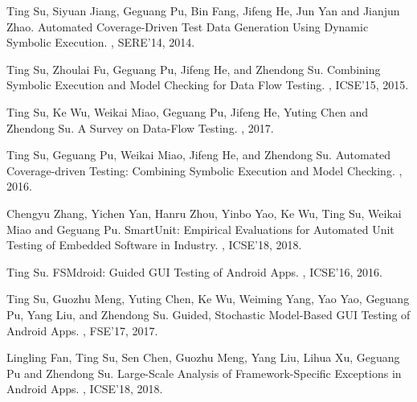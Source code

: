 \documentclass[a4paper]{article}
\begin{document}
\begin{thebibliography}{99}
	
	\newblock Ting Su, Siyuan Jiang, Geguang Pu, Bin Fang, Jifeng He, Jun Yan and Jianjun Zhao.
	\newblock Automated Coverage-Driven Test Data Generation Using Dynamic Symbolic Execution.
	, SERE'14, 2014.
	
	\newblock Ting Su, Zhoulai Fu, Geguang Pu, Jifeng He, and Zhendong Su.
	\newblock Combining Symbolic Execution and Model Checking for Data Flow Testing.
	, ICSE'15, 2015.
	
	\newblock Ting Su, Ke Wu, Weikai Miao, Geguang Pu, Jifeng He, Yuting Chen and Zhendong Su.
	\newblock A Survey on Data-Flow Testing.
	, 2017.
	
	\newblock Ting Su, Geguang Pu, Weikai Miao, Jifeng He, and Zhendong Su.
	\newblock Automated Coverage-driven Testing: Combining Symbolic Execution and Model Checking. 
	, 2016.

	\newblock Chengyu Zhang, Yichen Yan, Hanru Zhou, Yinbo Yao, Ke Wu, Ting Su, Weikai Miao and Geguang Pu.
	\newblock SmartUnit: Empirical Evaluations for Automated Unit Testing of Embedded Software in Industry.
	, ICSE'18, 2018.
	
	\newblock Ting Su.
	\newblock FSMdroid: Guided GUI Testing of Android Apps.
	, ICSE'16, 2016.
	
	\newblock Ting Su, Guozhu Meng, Yuting Chen, Ke Wu, Weiming Yang, Yao Yao, Geguang Pu, Yang Liu, and Zhendong Su.
	\newblock Guided, Stochastic Model-Based GUI Testing of Android Apps.
	, FSE'17, 2017.
	
	\newblock Lingling Fan, Ting Su, Sen Chen, Guozhu Meng, Yang Liu, Lihua Xu, Geguang Pu and Zhendong Su.
	\newblock Large-Scale Analysis of Framework-Specific Exceptions in Android Apps.
	, ICSE'18, 2018.
	

\end{thebibliography}
\end{document}
